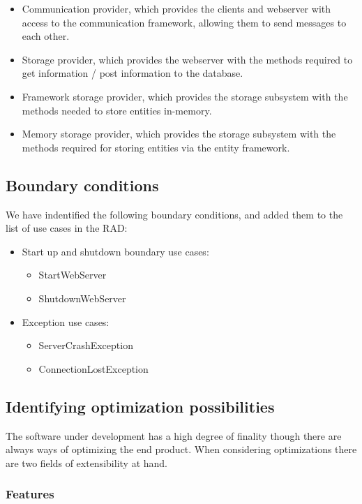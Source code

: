 \begin{itemize}
	\item Communication provider, which provides the clients and webserver with access to the communication framework, allowing them to send messages to each other.
	\item Storage provider, which provides the webserver with the methods required to get information / post information to the database.
	\item Framework storage provider, which provides the storage subsystem with the methods needed to store entities in-memory.
	\item Memory storage provider, which provides the storage subsystem with the methods required for storing entities via the entity framework.
\end{itemize}

\subsection{Boundary conditions}

We have indentified the following boundary conditions, and added them to the list of use cases in the RAD:

\begin{itemize}
	\item Start up and shutdown boundary use cases:
	\begin{itemize}
			\item StartWebServer
			\item ShutdownWebServer
	\end{itemize}
	\item Exception use cases:
	\begin{itemize}
			\item ServerCrashException
			\item ConnectionLostException
	\end{itemize}
\end{itemize}

\subsection{Identifying optimization possibilities}

The software under development has a high degree of finality though there are always ways of optimizing the end product.
When considering optimizations there are two fields of extensibility at hand.

\subsubsection{Features}

